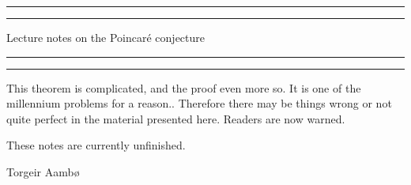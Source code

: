 

\begin{titlingpage}
    \vspace*{\fill}
    \rule[-11pt]{\textwidth}{1pt}
    \rule{\textwidth}{0.5pt}
    \begin{center}
    \Large Lecture notes on the Poincaré conjecture
    \end{center}
    \rule{\textwidth}{0.5pt}
    \rule[10.1pt]{\textwidth}{1pt}
    \begin{center}
    This theorem is complicated, and the proof even more so. 
    It is one of the millennium problems for a reason.. 
    Therefore there may be things wrong or not quite perfect in the material presented here. 
    Readers are now warned. 

    These notes are currently unfinished. 
    
    Torgeir Aambø 
    \end{center}
    \vspace{\fill}
    \tableofcontents
    \vspace{\fill}
\end{titlingpage}